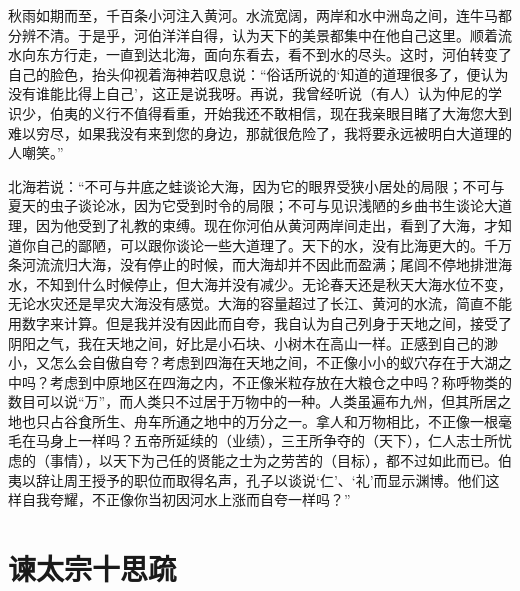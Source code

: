 \documentclass[12pt,UTF-8,openany,a4]{ctexbook}
\begin{document}
\begin{large}\yiwen
    
    秋雨如期而至，千百条小河注入黄河。水流宽阔，两岸和水中洲岛之间，连牛马都分辨不清。于是乎，河伯洋洋自得，认为天下的美景都集中在他自己这里。顺着流水向东方行走，一直到达北海，面向东看去，看不到水的尽头。这时，河伯转变了自己的脸色，抬头仰视着海神若叹息说：“俗话所说的‘知道的道理很多了，便认为没有谁能比得上自己’，这正是说我呀。再说，我曾经听说（有人）认为仲尼的学识少，伯夷的义行不值得看重，开始我还不敢相信，现在我亲眼目睹了大海您大到难以穷尽，如果我没有来到您的身边，那就很危险了，我将要永远被明白大道理的人嘲笑。”
    
    北海若说：“不可与井底之蛙谈论大海，因为它的眼界受狭小居处的局限；不可与夏天的虫子谈论冰，因为它受到时令的局限；不可与见识浅陋的乡曲书生谈论大道理，因为他受到了礼教的束缚。现在你河伯从黄河两岸间走出，看到了大海，才知道你自己的鄙陋，可以跟你谈论一些大道理了。天下的水，没有比海更大的。千万条河流流归大海，没有停止的时候，而大海却并不因此而盈满；尾闾不停地排泄海水，不知到什么时候停止，但大海并没有减少。无论春天还是秋天大海水位不变，无论水灾还是旱灾大海没有感觉。大海的容量超过了长江、黄河的水流，简直不能用数字来计算。但是我并没有因此而自夸，我自认为自己列身于天地之间，接受了阴阳之气，我在天地之间，好比是小石块、小树木在高山一样。正感到自己的渺小，又怎么会自傲自夸？考虑到四海在天地之间，不正像小小的蚁穴存在于大湖之中吗？考虑到中原地区在四海之内，不正像米粒存放在大粮仓之中吗？称呼物类的数目可以说“万”，而人类只不过居于万物中的一种。人类虽遍布九州，但其所居之地也只占谷食所生、舟车所通之地中的万分之一。拿人和万物相比，不正像一根毫毛在马身上一样吗？五帝所延续的（业绩），三王所争夺的（天下），仁人志士所忧虑的（事情），以天下为己任的贤能之士为之劳苦的（目标），都不过如此而已。伯夷以辞让周王授予的职位而取得名声，孔子以谈说‘仁’、‘礼’而显示渊博。他们这样自我夸耀，不正像你当初因河水上涨而自夸一样吗？”
    

\end{large}



\chapter{谏太宗十思疏}
\end{document}
